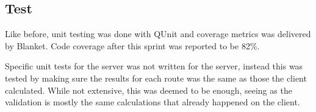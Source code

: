\subsection{Test}

Like before, unit testing was done with QUnit and coverage metrics was delivered by Blanket. Code coverage after this sprint was reported to be 82\%.

Specific unit tests for the server was not written for the server, instead this was tested by making sure the results for each route was the same as those the client calculated. While not extensive, this was deemed to be enough, seeing as the validation is mostly the same calculations that already happened on the client.




